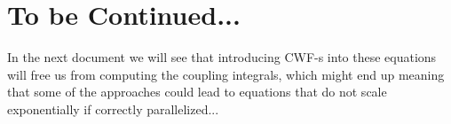 \documentclass[11pt, a4paper]{article} %
\begin{document}
\newpage

\section*{To be Continued...}
In the next document we will see that introducing CWF-s into these equations will free us from computing the coupling integrals, which might end up meaning that some of the approaches could lead to equations that do not scale exponentially if correctly parallelized...
















 


\end{document}
